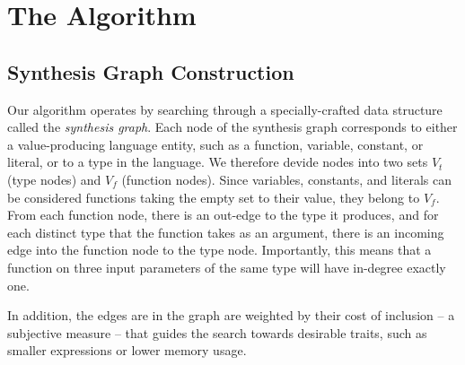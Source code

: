\section{The Algorithm}
\label{sec:algorithm}
\subsection{Synthesis Graph Construction}
\label{sec:algorithm:graph}

Our algorithm operates by searching through a specially-crafted data
structure called the {\emph{synthesis graph}}. Each node of the synthesis graph
corresponds to either a value-producing language entity, such as a
function, variable, constant, or literal, or to a type in the
language. We therefore devide nodes into two sets $V_t$ (type nodes) and $V_f$ (function nodes). 
Since variables, constants, and literals can be considered
functions taking the empty set to their value, they belong to $V_f$. From each function node, there is 
an out-edge to the type it produces, and for each distinct type that the
function takes as an argument, there is an incoming edge into the
function node to the type node. Importantly, this means that a
function on three input parameters of the same type will have
in-degree exactly one.

In addition, the edges are in the graph are
weighted by their cost of inclusion -- a subjective measure -- that
guides the search towards desirable traits, such as smaller
expressions or lower memory usage.
 


\iffalse
Each node is labeled by the full function signature so that
well-typed expressions can be synthesized. The edges in the graph are
weighted by their cost of inclusion -- a subjective measure -- that
guides the search towards desirable traits, such as smaller
expressions or lower memory usage.


The algorithm uses two procedures, along with some supporting
subroutines, to accomplish expression repairs by referring to this
graph. The repair algorithm itself degenerates into simple expression
synthesis when presented with an empty broken expression, and as such
subsumes the functionality described in
\cite{GveroETAL13CompleteCompletionTypesWeights}. Furthermore, the
algorithm can be seen as a generalization of the Prospector algorithm
described in \cite{MandelinetALL2005Jungloid}, since their
construction can be embedded within ours if only unary operations and
types are added to the graph.
\fi

